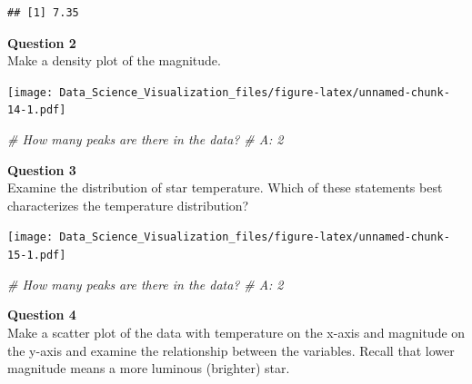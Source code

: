 \documentclass[
]{article}
\newenvironment{Shaded}{\begin{snugshade}}{\end{snugshade}}
\newcommand{\CommentTok}[1]{\textcolor[rgb]{0.56,0.35,0.01}{\textit{#1}}}
\newcommand{\KeywordTok}[1]{\textcolor[rgb]{0.13,0.29,0.53}{\textbf{#1}}}
\newcommand{\NormalTok}[1]{#1}
\newcommand{\OperatorTok}[1]{\textcolor[rgb]{0.81,0.36,0.00}{\textbf{#1}}}
\newcommand{\StringTok}[1]{\textcolor[rgb]{0.31,0.60,0.02}{#1}}
\begin{document}
\begin{verbatim}
## [1] 7.35
\end{verbatim}

\textbf{Question 2}\\
Make a density plot of the magnitude.

\begin{Shaded}
\end{Shaded}

\texttt{[image: Data\_Science\_Visualization\_files/figure-latex/unnamed-chunk-14-1.pdf]}

\begin{Shaded}
\begin{Highlighting}[]
\CommentTok{# How many peaks are there in the data?}
\CommentTok{# A: 2}
\end{Highlighting}
\end{Shaded}

\textbf{Question 3}\\
Examine the distribution of star temperature. Which of these statements
best characterizes the temperature distribution?

\begin{Shaded}
\end{Shaded}

\texttt{[image: Data\_Science\_Visualization\_files/figure-latex/unnamed-chunk-15-1.pdf]}

\begin{Shaded}
\begin{Highlighting}[]
\CommentTok{# How many peaks are there in the data?}
\CommentTok{# A: 2}
\end{Highlighting}
\end{Shaded}

\textbf{Question 4}\\
Make a scatter plot of the data with temperature on the x-axis and
magnitude on the y-axis and examine the relationship between the
variables. Recall that lower magnitude means a more luminous (brighter)
star.
\end{document}
